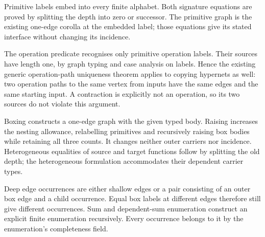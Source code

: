 Primitive labels embed into every finite alphabet. Both signature equations
are proved by splitting the depth into zero or successor. The primitive graph
is the existing one-edge corolla at the embedded label; those equations give
its stated interface without changing its incidence.





The operation predicate recognises only primitive operation labels. Their
sources have length one, by graph typing and case analysis on labels. Hence
the existing generic operation-path uniqueness theorem applies to copying
hypernets as well: two operation paths to the same vertex from inputs have
the same edges and the same starting input. A contraction is explicitly not
an operation, so its two sources do not violate this argument.





Boxing constructs a one-edge graph with the given typed body. Raising increases
the nesting allowance, relabelling primitives and recursively raising box
bodies while retaining all three counts. It changes neither outer carriers
nor incidence. Heterogeneous equalities of source and target functions follow
by splitting the old depth; the heterogeneous formulation accommodates their
dependent carrier types.





Deep edge occurrences are either shallow edges or a pair consisting of an
outer box edge and a child occurrence. Equal box labels at different edges
therefore still give different occurrences. Sum and dependent-sum enumeration
construct an explicit finite enumeration recursively. Every occurrence belongs
to it by the enumeration's completeness field.

